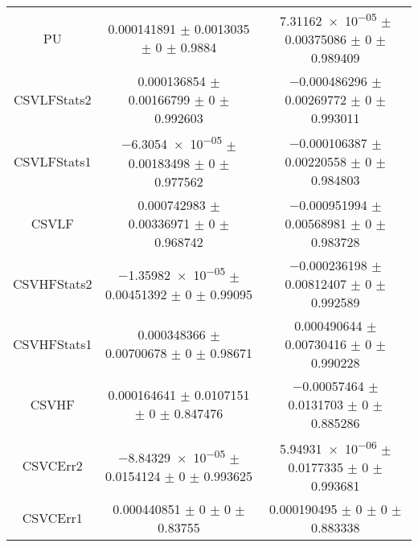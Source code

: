 \begin{table}
\begin{tabular}{ccc}
PU & \num{0.000141891} $\pm$ \num{0.0013035} $\pm$ \num{0} $\pm$ \num{0.9884} & \num{7.31162e-05} $\pm$ \num{0.00375086} $\pm$ \num{0} $\pm$ \num{0.989409}\\
CSVLFStats2 & \num{0.000136854} $\pm$ \num{0.00166799} $\pm$ \num{0} $\pm$ \num{0.992603} & \num{-0.000486296} $\pm$ \num{0.00269772} $\pm$ \num{0} $\pm$ \num{0.993011}\\
CSVLFStats1 & \num{-6.3054e-05} $\pm$ \num{0.00183498} $\pm$ \num{0} $\pm$ \num{0.977562} & \num{-0.000106387} $\pm$ \num{0.00220558} $\pm$ \num{0} $\pm$ \num{0.984803}\\
CSVLF & \num{0.000742983} $\pm$ \num{0.00336971} $\pm$ \num{0} $\pm$ \num{0.968742} & \num{-0.000951994} $\pm$ \num{0.00568981} $\pm$ \num{0} $\pm$ \num{0.983728}\\
CSVHFStats2 & \num{-1.35982e-05} $\pm$ \num{0.00451392} $\pm$ \num{0} $\pm$ \num{0.99095} & \num{-0.000236198} $\pm$ \num{0.00812407} $\pm$ \num{0} $\pm$ \num{0.992589}\\
CSVHFStats1 & \num{0.000348366} $\pm$ \num{0.00700678} $\pm$ \num{0} $\pm$ \num{0.98671} & \num{0.000490644} $\pm$ \num{0.00730416} $\pm$ \num{0} $\pm$ \num{0.990228}\\
CSVHF & \num{0.000164641} $\pm$ \num{0.0107151} $\pm$ \num{0} $\pm$ \num{0.847476} & \num{-0.00057464} $\pm$ \num{0.0131703} $\pm$ \num{0} $\pm$ \num{0.885286}\\
CSVCErr2 & \num{-8.84329e-05} $\pm$ \num{0.0154124} $\pm$ \num{0} $\pm$ \num{0.993625} & \num{5.94931e-06} $\pm$ \num{0.0177335} $\pm$ \num{0} $\pm$ \num{0.993681}\\
CSVCErr1 & \num{0.000440851} $\pm$ \num{0} $\pm$ \num{0} $\pm$ \num{0.83755} & \num{0.000190495} $\pm$ \num{0} $\pm$ \num{0} $\pm$ \num{0.883338}\\
\bottomrule
\end{tabular}
\end{table}